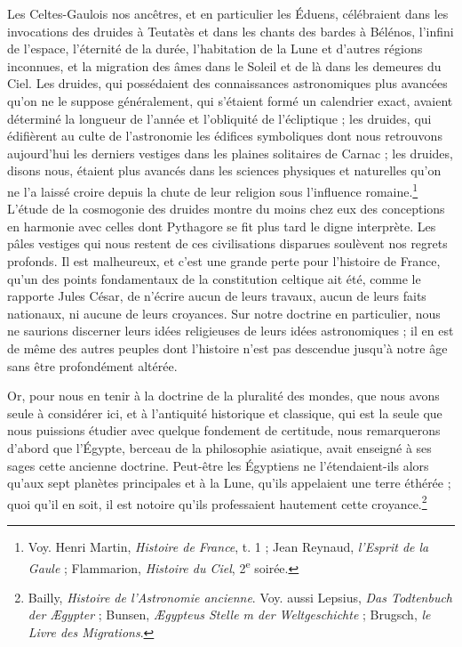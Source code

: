 \documentclass[a4paper, 11pt, oneside]{article}
\begin{document}
Les Celtes-Gaulois nos ancêtres, et en particulier les Éduens, célébraient dans les invocations des druides à Teutatès et dans les chants des bardes à Bélénos, l'infini de l'espace, l'éternité de la durée, l'habitation de la Lune et d'autres régions inconnues, et la migration des âmes dans le Soleil et de là dans les demeures du Ciel. Les druides, qui possédaient des connaissances astronomiques plus avancées qu'on ne le suppose généralement, qui s'étaient formé un calendrier exact, avaient déterminé la longueur de l'année et l'obliquité de l'écliptique ; les druides, qui édifièrent au culte de l'astronomie les édifices symboliques dont nous retrouvons aujourd'hui les derniers vestiges dans les plaines solitaires de Carnac ; les druides, disons nous, étaient plus avancés dans les sciences physiques et naturelles qu'on ne l'a laissé croire depuis la chute de leur religion sous l'influence romaine.\footnote{Voy. Henri Martin, \emph{Histoire de France}, t. 1 ; Jean Reynaud, \emph{l'Esprit de la Gaule} ; Flammarion, \emph{Histoire du Ciel}, 2\textsuperscript{e} soirée.} L'étude de la cosmogonie des druides montre du moins chez eux des conceptions en harmonie avec celles dont Pythagore se fit plus tard le digne interprète. Les pâles vestiges qui nous restent de ces civilisations disparues soulèvent nos regrets profonds. Il est malheureux, et c'est une grande perte pour l'histoire de France, qu'un des points fondamentaux de la constitution celtique ait été, comme le rapporte Jules César, de n'écrire aucun de leurs travaux, aucun de leurs faits nationaux, ni aucune de leurs croyances. Sur notre doctrine en particulier, nous ne saurions discerner leurs idées religieuses de leurs idées astronomiques ; il en est de même des autres peuples dont l'histoire n'est pas descendue jusqu'à notre âge sans être profondément altérée.

Or, pour nous en tenir à la doctrine de la pluralité des mondes, que nous avons seule à considérer ici, et à l'antiquité historique et classique, qui est la seule que nous puissions étudier avec quelque fondement de certitude, nous remarquerons d'abord que l'Égypte, berceau de la philosophie asiatique, avait enseigné à ses sages cette ancienne doctrine. Peut-être les Égyptiens ne l'étendaient-ils alors qu'aux sept planètes principales et à la Lune, qu'ils appelaient une terre éthérée ; quoi qu'il en soit, il est notoire qu'ils professaient hautement cette croyance.\footnote{Bailly, \emph{Histoire de l'Astronomie ancienne}. Voy. aussi Lepsius, \emph{Das Todtenbuch der Ægypter} ; Bunsen, \emph{Ægypteus Stelle m der Weltgeschichte} ; Brugsch, \emph{le Livre des Migrations}.}
\end{document}
